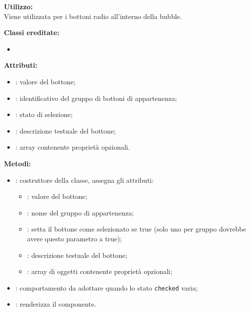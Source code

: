 \textbf{Utilizzo:}\\
Viene utilizzata per i bottoni radio all'interno della bubble.

\textbf{Classi ereditate:}
\begin{itemize}
	\item {}
\end{itemize}


\textbf{Attributi:}
\begin{itemize}
	\item {}: valore del bottone;
	\item {}: identificativo del gruppo di bottoni di appartenenza;
	\item {}: stato di selezione;
	\item {}: descrizione testuale del bottone;
	\item {}: array contenente proprietà opzionali.
\end{itemize}

\textbf{Metodi:}
\begin{itemize}
	\item {}: costruttore della classe, assegna gli attributi:
	\begin{itemize}
		\item {}: valore del bottone;
		\item {}: nome del gruppo di appartenenza;
		\item {}: setta il bottone come selezionato se true (solo uno per gruppo dovrebbe avere questo parametro a true);
		\item {}: descrizione testuale del bottone;
		\item {}: array di oggetti contenente proprietà opzionali;
	\end{itemize}
	\item {}: comportamento da adottare quando lo stato \texttt{checked} varia;
	\item {}: renderizza il componente.
\end{itemize}


